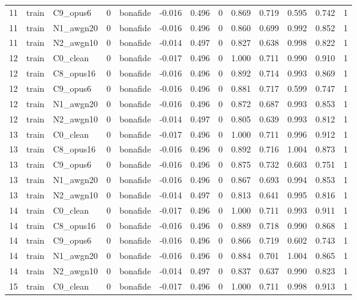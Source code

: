 \begin{tabular}{rllrlrrrrrrrr}
11 & train & C9_opus6 & 0 & bonafide & -0.016 & 0.496 & 0 & 0.869 & 0.719 & 0.595 & 0.742 & 1 \\
11 & train & N1_awgn20 & 0 & bonafide & -0.016 & 0.496 & 0 & 0.860 & 0.699 & 0.992 & 0.852 & 1 \\
11 & train & N2_awgn10 & 0 & bonafide & -0.014 & 0.497 & 0 & 0.827 & 0.638 & 0.998 & 0.822 & 1 \\
12 & train & C0_clean & 0 & bonafide & -0.017 & 0.496 & 0 & 1.000 & 0.711 & 0.990 & 0.910 & 1 \\
12 & train & C8_opus16 & 0 & bonafide & -0.016 & 0.496 & 0 & 0.892 & 0.714 & 0.993 & 0.869 & 1 \\
12 & train & C9_opus6 & 0 & bonafide & -0.016 & 0.496 & 0 & 0.881 & 0.717 & 0.599 & 0.747 & 1 \\
12 & train & N1_awgn20 & 0 & bonafide & -0.016 & 0.496 & 0 & 0.872 & 0.687 & 0.993 & 0.853 & 1 \\
12 & train & N2_awgn10 & 0 & bonafide & -0.014 & 0.497 & 0 & 0.805 & 0.639 & 0.993 & 0.812 & 1 \\
13 & train & C0_clean & 0 & bonafide & -0.017 & 0.496 & 0 & 1.000 & 0.711 & 0.996 & 0.912 & 1 \\
13 & train & C8_opus16 & 0 & bonafide & -0.016 & 0.496 & 0 & 0.892 & 0.716 & 1.004 & 0.873 & 1 \\
13 & train & C9_opus6 & 0 & bonafide & -0.016 & 0.496 & 0 & 0.875 & 0.732 & 0.603 & 0.751 & 1 \\
13 & train & N1_awgn20 & 0 & bonafide & -0.016 & 0.496 & 0 & 0.867 & 0.693 & 0.994 & 0.853 & 1 \\
13 & train & N2_awgn10 & 0 & bonafide & -0.014 & 0.497 & 0 & 0.813 & 0.641 & 0.995 & 0.816 & 1 \\
14 & train & C0_clean & 0 & bonafide & -0.017 & 0.496 & 0 & 1.000 & 0.711 & 0.993 & 0.911 & 1 \\
14 & train & C8_opus16 & 0 & bonafide & -0.016 & 0.496 & 0 & 0.889 & 0.718 & 0.990 & 0.868 & 1 \\
14 & train & C9_opus6 & 0 & bonafide & -0.016 & 0.496 & 0 & 0.866 & 0.719 & 0.602 & 0.743 & 1 \\
14 & train & N1_awgn20 & 0 & bonafide & -0.016 & 0.496 & 0 & 0.884 & 0.701 & 1.004 & 0.865 & 1 \\
14 & train & N2_awgn10 & 0 & bonafide & -0.014 & 0.497 & 0 & 0.837 & 0.637 & 0.990 & 0.823 & 1 \\
15 & train & C0_clean & 0 & bonafide & -0.017 & 0.496 & 0 & 1.000 & 0.711 & 0.998 & 0.913 & 1 \\

\end{tabular}
